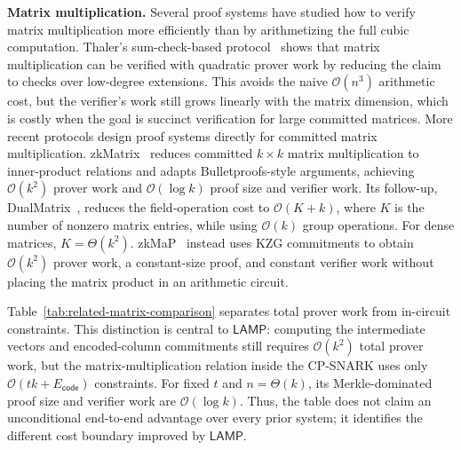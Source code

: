 \documentclass[conference,compsoc]{IEEEtran}
\newcommand{\protocol}{\textsf{LAMP}}   %
\theoremstyle{plain}
\theoremstyle{definition}
\theoremstyle{remark}
\providecommand{\DIFaddtex}[1]{{\protect\color{DIFADD} \sf #1}} %
\providecommand{\DIFaddbegin}{} %
\providecommand{\DIFaddend}{} %
\providecommand{\DIFadd}[1]{\texorpdfstring{\DIFaddtex{#1}}{#1}} %
\providecommand{\DIFaddincludegraphics}[2][]{{\color{blue}\fbox{\DIFOincludegraphics[#1]{#2}}}} %
\DeclareRobustCommand{\DIFaddbegin}{\DIFOaddbegin \let\includegraphics\DIFaddincludegraphics} %
\DeclareRobustCommand{\DIFaddend}{\DIFOaddend \let\includegraphics\DIFOincludegraphics} %
\begin{document}
\noindent\textbf{Matrix multiplication.}
Several proof systems have studied how to verify matrix multiplication more
efficiently than by arithmetizing the full cubic computation. Thaler's
sum-check-based protocol~\cite{thaler2013time} shows that matrix multiplication
can be verified with quadratic prover work by reducing the claim to checks over
low-degree extensions. This avoids the naive \(\mathcal{O}(n^3)\) arithmetic
cost, but the verifier's work still grows linearly with the matrix dimension,
which is costly when the goal is succinct verification for large committed
matrices.
More recent protocols design proof systems directly for committed matrix
multiplication. zkMatrix~\cite{cong2024zkmatrix} reduces committed
 \DIFaddbegin \DIFadd{\(k\times k\) }\DIFaddend matrix multiplication to  inner-product relations and  \DIFaddbegin \DIFadd{adapts
Bulletproofs-style arguments, achieving \(\mathcal{O}(k^2)\) prover work and
\(\mathcal{O}(\log k)\) proof size and verifier work. Its follow-up,
DualMatrix~\cite{cong2026dualmatrix}, reduces the field-operation cost to
\(\mathcal{O}(K+k)\), where \(K\) is the number of nonzero matrix entries, while
using \(\mathcal{O}(k)\) group operations. For dense matrices,
\(K=\Theta(k^2)\). }\DIFaddend zkMaP~\cite{zkMaP} instead uses KZG commitments to obtain
 \DIFaddbegin \DIFadd{\(\mathcal{O}(k^2)\) prover work, a constant-size proof, and constant verifier
work without placing the matrix product in an arithmetic circuit.
}

\DIFadd{Table~\ref{tab:related-matrix-comparison} separates total prover work from
in-circuit constraints. This distinction is central to \(\protocol\): computing
the intermediate vectors and encoded-column commitments still requires
\(\mathcal{O}(k^2)\) total prover work, but the matrix-multiplication relation
inside the CP-SNARK uses only
\(\mathcal{O}(tk+E_{\mathsf{code}})\) constraints. For fixed \(t\) and
\(n=\Theta(k)\), its Merkle-dominated proof size and verifier work are
\(\mathcal{O}(\log k)\). Thus, the table does not claim an unconditional
end-to-end advantage over every prior system; it identifies the different cost
boundary improved by \(\protocol\).
}
\end{document}
